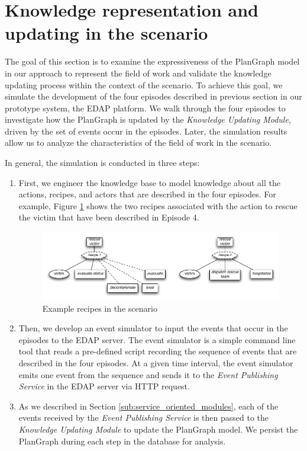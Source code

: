 \section{Knowledge representation and updating in the scenario} %
\label{sec:knowledge_representation_and_updating_in_the_scenario}
The goal of this section is to examine the expressiveness of the PlanGraph model in our approach to represent the field of work and validate the knowledge updating process within the context of the scenario. To achieve this goal, we simulate the development of the four episodes described in previous section in our prototype system, the EDAP platform. We walk through the four episodes to investigate how the PlanGraph is updated by the \emph{Knowledge Updating Module}, driven by the set of events occur in the episodes. Later, the simulation results allow us to analyze the characteristics of the field of work in the scenario.

In general, the simulation is conducted in three steps:

\begin{enumerate}
	\item First, we engineer the knowledge base to model knowledge about all the actions, recipes, and actors that are described in the four episodes. For example, Figure \ref{fig:example_recipes_in_scenario} shows the two recipes associated with the action to rescue the victim that have been described in Episode 4.
	\begin{figure}[htbp] %
   		\centering
   		\includegraphics[width=5.8in]{example_recipes_in_scenario.pdf} 
   		\caption{Example recipes in the scenario}
   		\label{fig:example_recipes_in_scenario}
	\end{figure}
	\item Then, we develop an event simulator to input the events that occur in the episodes to the EDAP server. The event simulator is a simple command line tool that reads a pre-defined script recording the sequence of events that are described in the four episodes. At a given time interval, the event simulator emits one event from the sequence and sends it to the \emph{Event Publishing Service} in the EDAP server via HTTP request. 
	\item As we described in Section \ref{sub:service_oriented_modules}, each of the events received by the \emph{Event Publishing Service} is then passed to the \emph{Knowledge Updating Module} to update the PlanGraph model. We persist the PlanGraph during each step in the database for analysis.
\end{enumerate}

